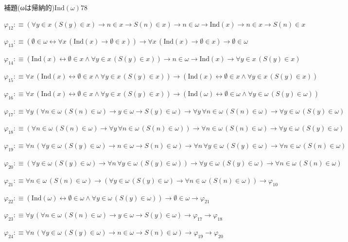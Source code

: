 \begin{fullproof}{補題(ωは帰納的)}{$\mathrm{Ind}(\omega)$}{78}
\begin{abbrevlist}
\item $\varphi_{12} :\equiv (\forall y \in x\,(S(y) \in x) \to n \in x \to S(n) \in x) \to n \in \omega \to \mathrm{Ind}(x) \to n \in x \to S(n) \in x$
\item $\varphi_{13} :\equiv (\emptyset \in \omega \leftrightarrow \forall x\,(\mathrm{Ind}(x) \to \emptyset \in x)) \to \forall x\,(\mathrm{Ind}(x) \to \emptyset \in x) \to \emptyset \in \omega$
\item $\varphi_{14} :\equiv (\mathrm{Ind}(x) \leftrightarrow \emptyset \in x \land \forall y \in x\,(S(y) \in x)) \to n \in \omega \to \mathrm{Ind}(x) \to \forall y \in x\,(S(y) \in x)$
\item $\varphi_{15} :\equiv \forall x\,(\mathrm{Ind}(x) \leftrightarrow \emptyset \in x \land \forall y \in x\,(S(y) \in x)) \to (\mathrm{Ind}(x) \leftrightarrow \emptyset \in x \land \forall y \in x\,(S(y) \in x))$
\item $\varphi_{16} :\equiv \forall x\,(\mathrm{Ind}(x) \leftrightarrow \emptyset \in x \land \forall y \in x\,(S(y) \in x)) \to (\mathrm{Ind}(\omega) \leftrightarrow \emptyset \in \omega \land \forall y \in \omega\,(S(y) \in \omega))$
\item $\varphi_{17} :\equiv \forall y\,(\forall n \in \omega\,(S(n) \in \omega) \to y \in \omega \to S(y) \in \omega) \to \forall y\,\forall n \in \omega\,(S(n) \in \omega) \to \forall y \in \omega\,(S(y) \in \omega)$
\item $\varphi_{18} :\equiv (\forall n \in \omega\,(S(n) \in \omega) \to \forall y\,\forall n \in \omega\,(S(n) \in \omega)) \to \forall n \in \omega\,(S(n) \in \omega) \to \forall y \in \omega\,(S(y) \in \omega)$
\item $\varphi_{19} :\equiv \forall n\,(\forall y \in \omega\,(S(y) \in \omega) \to n \in \omega \to S(n) \in \omega) \to \forall n\,\forall y \in \omega\,(S(y) \in \omega) \to \forall n \in \omega\,(S(n) \in \omega)$
\item $\varphi_{20} :\equiv (\forall y \in \omega\,(S(y) \in \omega) \to \forall n\,\forall y \in \omega\,(S(y) \in \omega)) \to \forall y \in \omega\,(S(y) \in \omega) \to \forall n \in \omega\,(S(n) \in \omega)$
\item $\varphi_{21} :\equiv \forall n \in \omega\,(S(n) \in \omega) \to (\forall y \in \omega\,(S(y) \in \omega) \to \forall n \in \omega\,(S(n) \in \omega)) \to \varphi_{10}$
\item $\varphi_{22} :\equiv (\mathrm{Ind}(\omega) \leftrightarrow \emptyset \in \omega \land \forall y \in \omega\,(S(y) \in \omega)) \to \emptyset \in \omega \to \varphi_{21}$
\item $\varphi_{23} :\equiv \forall y\,(\forall n \in \omega\,(S(n) \in \omega) \to y \in \omega \to S(y) \in \omega) \to \varphi_{17} \to \varphi_{18}$
\item $\varphi_{24} :\equiv \forall n\,(\forall y \in \omega\,(S(y) \in \omega) \to n \in \omega \to S(n) \in \omega) \to \varphi_{19} \to \varphi_{20}$
\end{abbrevlist}
\end{fullproof}
